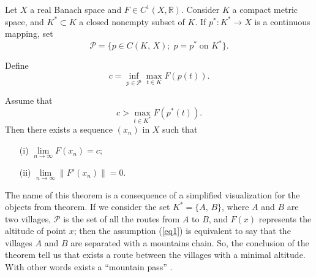 \documentclass[12pt]{article}
\begin{document}
Let $X$ a real Banach space and $F \in C^{1}(X,\mathbb{R})$. Consider $K$ a compact metric space, and $K^{*} \subset K$ a closed nonempty subset of $K$. If $p^{*} : K^{*} \rightarrow X$ is a continuous mapping, set 
\[
\mathcal{P} = \{ p \in C(K, \, X); \; p = p^{*} \; \textrm{on } K^{*} \}.
\]

Define 
\[
c = \inf_{p \in \mathcal{P}} \max_{t \in K} F(p(t)).
\]

Assume that
\begin{equation}\label{eq1}
c > \max_{t \in K^{*}} F(p^{*}(t)).
\end{equation}
Then there exists a sequence $(x_{n})$ in $X$ such that
\begin{enumerate}
\item[(i)] $\lim\limits_{n \rightarrow \infty} F(x_{n}) = c$;

\item[(ii)] $\lim\limits_{n \rightarrow \infty} \| F'(x_{n})\|  = 0$.
\end{enumerate}

The name of this theorem is a consequence of a simplified visualization for the objects from theorem. If we consider the set $K^{*} = \{ A, \, B\}$, where $A$ and $B$ are two villages, $\mathcal{P}$ is the set of all the routes from $A$ to $B$, and $F(x)$ represents the altitude of point $x$; then the assumption (\ref{eq1}) is equivalent to say that the villages $A$ and $B$ are separated with a mountains chain. So, the conclusion of the theorem tell us that exists a route between the villages with a minimal altitude. With other words exists a  ``mountain pass'' .
\end{document}
